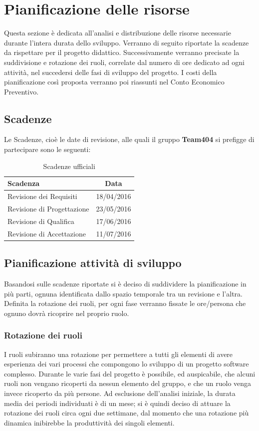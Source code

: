 \documentclass[a4paper,11pt]{article}
\begin{document}
	\newpage
	\section{Pianificazione delle risorse}	
	Questa sezione è dedicata all'analisi e distribuzione delle risorse necessarie durante l'intera durata dello sviluppo. Verranno di seguito riportate la scadenze da rispettare per il progetto didattico. Successivamente verranno precisate la suddivisione e rotazione dei ruoli, correlate dal numero di ore dedicato ad ogni attività, nel succedersi delle fasi di sviluppo del progetto. I costi della pianificazione così proposta verranno poi riassunti nel Conto Economico Preventivo.
	\subsection{Scadenze}
	Le Scadenze, cioè le date di revisione, alle quali il gruppo \textbf{Team404} si prefigge di partecipare sono le seguenti:
	\begin{table}[h!]
	\begin{center}
		\begin{tabularx}{240pt}{Xc}
			\textbf{Scadenza} & \textbf{Data}\\
			\midrule
			Revisione dei Requisiti & 18/04/2016\\
			Revisione di Progettazione & 23/05/2016\\
			Revisione di Qualifica & 17/06/2016\\
			Revisione di Accettazione & 11/07/2016\\
			\bottomrule
		\end{tabularx}
	\end{center}
	\caption{Scadenze ufficiali	}
	\end{table}
	
	\subsection{Pianificazione attività di sviluppo}
	Basandosi sulle scadenze riportate si è deciso di suddividere la pianificazione in più parti, ognuna identificata dallo spazio temporale tra un revisione e l'altra. Definita la rotazione dei ruoli, per ogni fase verranno fissate le ore/persona che ognuno dovrà ricoprire nel proprio ruolo.
	 \subsubsection{Rotazione dei ruoli}
I ruoli subiranno una rotazione per permettere a tutti gli elementi di avere esperienza dei vari processi che compongono lo sviluppo di un progetto software complesso. Durante le varie fasi del progetto è possibile, ed auspicabile, che alcuni ruoli non vengano ricoperti da nessun elemento del gruppo, e che un ruolo venga invece ricoperto da più persone. Ad esclusione dell'analisi iniziale, la durata media dei periodi individuati è di un mese; si è quindi deciso di attuare la rotazione dei ruoli circa ogni due settimane, dal momento che una rotazione più dinamica inibirebbe la produttività dei singoli elementi.
		\pagebreak
\end{document}
